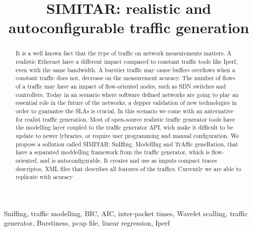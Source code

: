 \title{SIMITAR: realistic and autoconfigurable traffic generation}

\author{
\and
{}
}

\maketitle

\begin{abstract}
It is a well known fact that the type of traffic on network measurements matters. A realistic Ethernet have a different impact compared to constant traffic tools like Iperf, even with the same bandwidth. A burstier traffic may cause buffers overflows when a constant traffic does not, decrease on the measurement acuracy. The number of flows of a traffic may have an impact of flow-oriented nodes, such as SDN switches and controllers. Today in an scenario where software defined networks are going to play an essential role in the future of the networks, a depper validation of new technologies in order to guarantee the SLAs is crucial. In this scenario we come with an anternative for realist traffic generation. Most of open-source realistic traffic generator tools have the modelling layer coupled to the traffic generator API, wich make it difficult to be update to newer lybraries, or require user programming and manual configuration. We propose a sollution called SIMITAR: SnIffing, ModellIng and TrAffic geneRation, that have a separated moddelling framework from the traffic generator, which is flow-oriented, and is autoconfigurable. It creates and use as imputs compact traces descriptos, XML files that describes all features of the traffics. 
Currently we are able to replicate with acuracy 
\end{abstract}

\begin{IEEEkeywords}
Sniffing, traffic modelling, BIC, AIC, inter-packet times, Wavelet scalling, traffic generator, Burstiness, pcap file, linear regression, Iperf
\end{IEEEkeywords}


